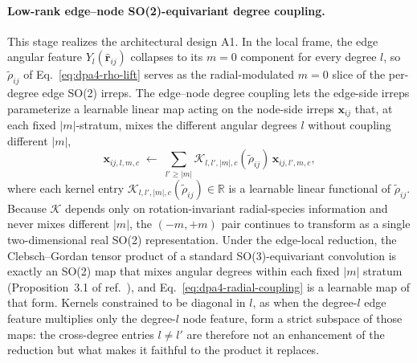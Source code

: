 \paragraph{Low-rank edge--node SO(2)-equivariant degree coupling.}
This stage realizes the architectural design A1.
In the local frame, the edge angular feature $Y_l(\widehat{\mathbf{r}}_{ij})$ collapses to its $m=0$ component for every degree $l$, so $\widetilde{\rho}_{ij}$ of Eq.~\eqref{eq:dpa4-rho-lift} serves as the radial-modulated $m=0$ slice of the per-degree edge SO(2) irreps.
The edge--node degree coupling lets the edge-side irreps parameterize a learnable linear map acting on the node-side irreps $\mathbf{x}_{ij}$ that, at each fixed $|m|$-stratum, mixes the different angular degrees $l$ without coupling different $|m|$,
\begin{equation}
    \mathbf{x}_{ij,l,m,c}\;\leftarrow\;
    \sum_{l'\geq |m|}
    \mathcal{K}_{l,l',|m|,c}(\widetilde{\rho}_{ij})\,\mathbf{x}_{ij,l',m,c},
    \label{eq:dpa4-radial-coupling}
\end{equation}
where each kernel entry $\mathcal{K}_{l,l',|m|,c}(\widetilde{\rho}_{ij})\in \mathbb{R}$ is a learnable linear functional of $\widetilde{\rho}_{ij}$.
Because $\mathcal{K}$ depends only on rotation-invariant radial-species information and never mixes different $|m|$, the $(-m,+m)$ pair continues to transform as a single two-dimensional real SO(2) representation.
Under the edge-local reduction, the Clebsch--Gordan tensor product of a standard SO(3)-equivariant convolution is exactly an SO(2) map that mixes angular degrees within each fixed $|m|$ stratum (Proposition~3.1 of ref.~\cite{passaro2023reducing}), and Eq.~\eqref{eq:dpa4-radial-coupling} is a learnable map of that form.
Kernels constrained to be diagonal in $l$, as when the degree-$l$ edge feature multiplies only the degree-$l$ node feature, form a strict subspace of those maps: the cross-degree entries $l\neq l'$ are therefore not an enhancement of the reduction but what makes it faithful to the product it replaces.

